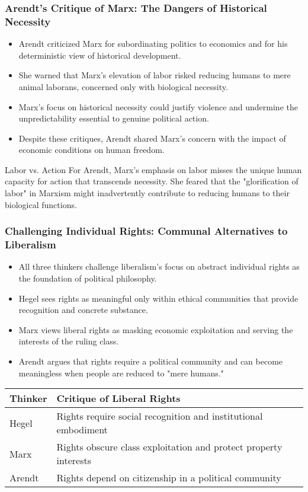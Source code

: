 \documentclass{beamer}
\begin{document}
\begin{frame}
\frametitle{Arendt's Critique of Marx: The Dangers of Historical Necessity}
\begin{itemize}
    \item Arendt criticized Marx for subordinating politics to economics and for his deterministic view of historical development.
    \item She warned that Marx's elevation of labor risked reducing humans to mere animal laborans, concerned only with biological necessity.
    \item Marx's focus on historical necessity could justify violence and undermine the unpredictability essential to genuine political action.
    \item Despite these critiques, Arendt shared Marx's concern with the impact of economic conditions on human freedom.
\end{itemize}

\begin{alertblock}{Labor vs. Action}
For Arendt, Marx's emphasis on labor misses the unique human capacity for action that transcends necessity. She feared that the "glorification of labor" in Marxism might inadvertently contribute to reducing humans to their biological functions.
\end{alertblock}
\end{frame}


\begin{frame}
\frametitle{Challenging Individual Rights: Communal Alternatives to Liberalism}
\begin{itemize}
    \item All three thinkers challenge liberalism's focus on abstract individual rights as the foundation of political philosophy.
    \item Hegel sees rights as meaningful only within ethical communities that provide recognition and concrete substance.
    \item Marx views liberal rights as masking economic exploitation and serving the interests of the ruling class.
    \item Arendt argues that rights require a political community and can become meaningless when people are reduced to "mere humans."
\end{itemize}

\begin{center}
\begin{tabular}{lp{8cm}}
\toprule
\textbf{Thinker} & \textbf{Critique of Liberal Rights} \\
\midrule
Hegel & Rights require social recognition and institutional embodiment \\
Marx & Rights obscure class exploitation and protect property interests \\
Arendt & Rights depend on citizenship in a political community \\
\bottomrule
\end{tabular}
\end{center}
\end{frame}
\end{document}
